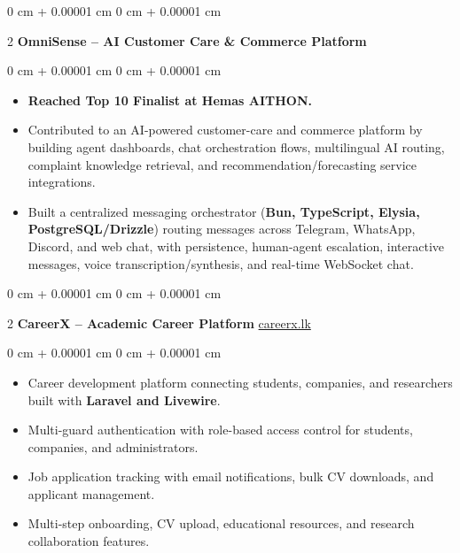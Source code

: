 \documentclass[10pt, letterpaper]{article}
\newenvironment{highlights}{ \begin{itemize}[ topsep=0.10 cm, parsep=0.10 cm, partopsep=0pt,
itemsep=0pt, leftmargin=0 cm + 10pt ] }{ \end{itemize} } %
\newenvironment{onecolentry}{ \begin{adjustwidth}{ 0 cm + 0.00001 cm }{ 0 cm + 0.00001 cm }
}{ \end{adjustwidth} } %
\newenvironment{twocolentry}[2][]{ \onecolentry \def\secondColumn{#2} \setcolumnwidth{\fill, 4.5 cm}
\begin{paracol}{2} }{ \switchcolumn \raggedleft \secondColumn \end{paracol}
\endonecolentry } %
\begin{document}
  \begin{twocolentry}
    {} \textbf{OmniSense -- AI Customer Care \& Commerce Platform}
  \end{twocolentry}
  \vspace{0.10 cm}
  \begin{onecolentry}
    \begin{highlights}
      \item \textbf{Reached Top 10 Finalist at Hemas AITHON.} \item Contributed to an
      AI-powered customer-care and commerce platform by building agent
      dashboards, chat orchestration flows, multilingual AI routing, complaint
      knowledge retrieval, and recommendation/forecasting service integrations.
      \item Built a centralized messaging orchestrator (\textbf{Bun, TypeScript,
      Elysia, PostgreSQL/Drizzle}) routing messages across Telegram, WhatsApp,
      Discord, and web chat, with persistence, human-agent escalation,
      interactive messages, voice transcription/synthesis, and real-time
      WebSocket chat.
    \end{highlights}
  \end{onecolentry}

  \vspace{0.5 cm}

  \begin{twocolentry}
    {\href{https://careerx.lk}{careerx.lk}} \textbf{CareerX -- Academic Career Platform}
  \end{twocolentry}
  \vspace{0.10 cm}
  \begin{onecolentry}
    \begin{highlights}
      \item Career development platform connecting students, companies, and researchers built with \textbf{Laravel and Livewire}.
      \item Multi-guard authentication with role-based access control for students, companies, and administrators.
      \item Job application tracking with email notifications, bulk CV downloads, and applicant management.
      \item Multi-step onboarding, CV upload, educational resources, and research collaboration features.
    \end{highlights}
  \end{onecolentry}

  \vspace{0.5 cm}
\end{document}
